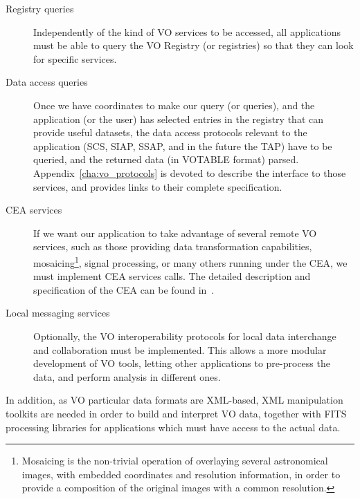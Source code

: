 \begin{description}
			 \item[Registry queries] Independently of the kind of
			VO services to be accessed, all applications must be
			able to query the VO Registry (or registries) so that
			they can look for specific services.
			
			 \item[Data access queries] Once we have coordinates to
			make our query (or queries), and the application (or
			the user) has selected entries in the registry that can
			provide useful datasets, the data access protocols
			relevant to the application (SCS, SIAP, SSAP, and in
			the future the TAP) have to be queried, and the
			returned data (in VOTABLE format) parsed.
			Appendix~\ref{cha:vo_protocols} is devoted to describe
			the interface to those services, and provides links to
			their complete specification.
			
			 \item[CEA services] If we want our application to take
			advantage of several remote VO services, such as those
			providing data transformation capabilities,
			mosaicing\footnote{Mosaicing is the non-trivial
			operation of overlaying several astronomical images,
			with embedded coordinates and resolution information,
			in order to provide a composition of the original
			images with a common resolution.}, signal processing,
			or many others running under the CEA, we must implement
			CEA services calls. The detailed description and
			specification of the CEA can be found
			in~\cite{Harrison:2005la}.
			
			 \item[Local messaging services] Optionally, the VO
			interoperability protocols for local data interchange
			and collaboration must be implemented. This allows a
			more modular development of VO tools, letting other
			applications to pre-process the data, and perform
			analysis in different ones.
		\end{description}

		In addition, as VO particular data formats are XML-based,
		XML manipulation toolkits are needed in order to build and
		interpret VO data, together with FITS processing libraries
		for applications which must have access to the actual data.

